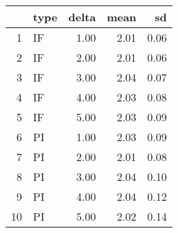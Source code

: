 \begin{table}[ht]
\centering
\begin{tabular}{rlrrr}
  \hline
 & type & delta & mean & sd \\ 
  \hline
1 & IF & 1.00 & 2.01 & 0.06 \\ 
  2 & IF & 2.00 & 2.01 & 0.06 \\ 
  3 & IF & 3.00 & 2.04 & 0.07 \\ 
  4 & IF & 4.00 & 2.03 & 0.08 \\ 
  5 & IF & 5.00 & 2.03 & 0.09 \\ 
  6 & PI & 1.00 & 2.03 & 0.09 \\ 
  7 & PI & 2.00 & 2.01 & 0.08 \\ 
  8 & PI & 3.00 & 2.04 & 0.10 \\ 
  9 & PI & 4.00 & 2.04 & 0.12 \\ 
  10 & PI & 5.00 & 2.02 & 0.14 \\ 
   \hline
\end{tabular}
\end{table}
